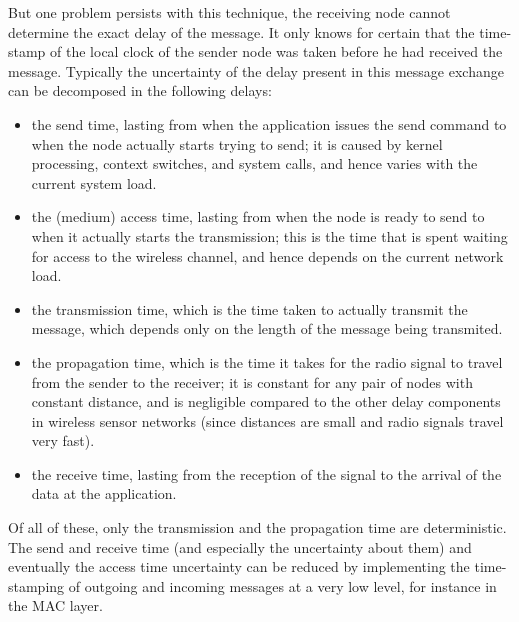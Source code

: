 But one problem persists with this technique, the receiving node cannot determine the exact delay of the message. It only knows for certain that the time-stamp of the local clock of the sender node was taken before he had received the message. Typically the uncertainty of the delay present in this message exchange can be decomposed in the following delays:

\begin{itemize}
\item the send time, lasting from when the application issues the send command to when the node actually starts trying to send; it is caused by kernel processing, context switches, and system calls, and hence varies with the current system load.
\item the (medium) access time, lasting from when the node is ready to send to when it actually starts the transmission; this is the time that is spent waiting for access to the wireless channel, and hence depends on the current network load.
\item the transmission time, which is the time taken to actually transmit the message, which depends only on the length of the message being transmited.
\item the propagation time, which is the time it takes for the radio signal to travel from the sender to the receiver; it is constant for any pair of nodes with constant distance, and is negligible compared to the other delay components in wireless sensor networks (since distances are small and radio signals travel very fast).
\item the receive time, lasting from the reception of the signal to the arrival of the data at the application.
\end{itemize}

Of all of these, only the transmission and the propagation time are deterministic. The send and receive time (and especially the uncertainty about them) and eventually the access time uncertainty can be reduced by implementing the time-stamping of outgoing and incoming messages at a very low level, for instance in the MAC layer.

